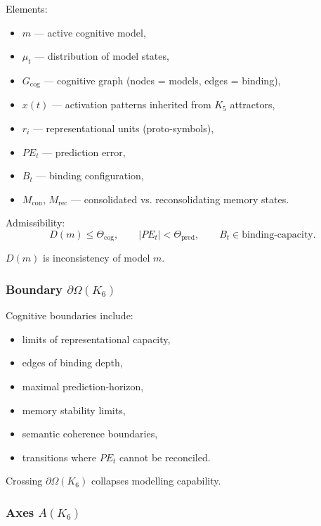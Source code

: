 Elements:
\begin{itemize}
    \item $m$ — active cognitive model,
    \item $\mu_t$ — distribution of model states,
    \item $G_{\mathrm{cog}}$ — cognitive graph (nodes = models, edges = binding),
    \item $x(t)$ — activation patterns inherited from $K_5$ attractors,
    \item $r_i$ — representational units (proto-symbols),
    \item $PE_t$ — prediction error,
    \item $B_t$ — binding configuration,
    \item $M_{\mathrm{con}}$, $M_{\mathrm{rec}}$ — consolidated vs. reconsolidating memory states.
\end{itemize}

Admissibility:
\[
D(m) \le \Theta_{\mathrm{cog}}, \qquad
|PE_t| < \Theta_{\mathrm{pred}}, \qquad
B_t \in \text{binding-capacity}.
\]

$D(m)$ is inconsistency of model $m$.

\subsubsection{Boundary \texorpdfstring{$\partial\Omega(K_6)$}{\partial\Omega(K_6)}}

Cognitive boundaries include:
\begin{itemize}
    \item limits of representational capacity,
    \item edges of binding depth,
    \item maximal prediction-horizon,
    \item memory stability limits,
    \item semantic coherence boundaries,
    \item transitions where $PE_t$ cannot be reconciled.
\end{itemize}

Crossing $\partial \Omega(K_6)$ collapses modelling capability.

\subsubsection{Axes \texorpdfstring{$A(K_6)$}{A(K_6)}}

